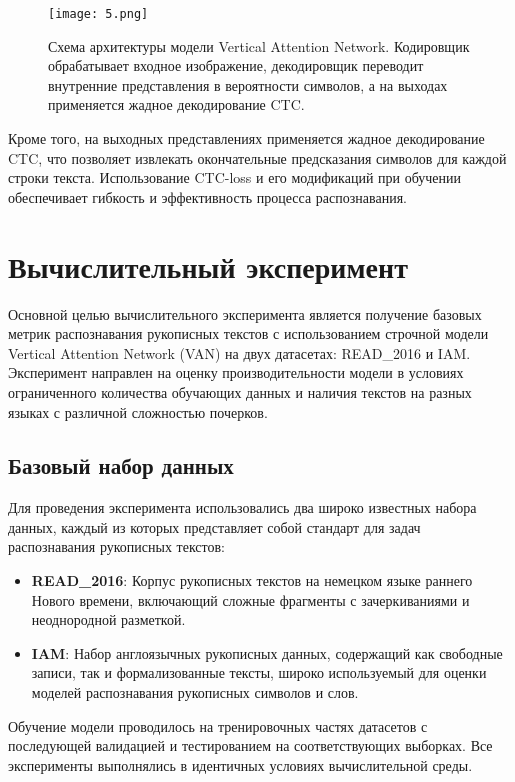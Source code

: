 \documentclass{article}
\begin{document}
\begin{figure}[h]
    \centering
    \texttt{[image: 5.png]}
    \caption{Схема архитектуры модели Vertical Attention Network. Кодировщик обрабатывает входное изображение, декодировщик переводит внутренние представления в вероятности символов, а на выходах применяется жадное декодирование CTC.}
    \label{fig:architecture}
\end{figure}

Кроме того, на выходных представлениях применяется жадное декодирование CTC, что позволяет извлекать окончательные предсказания символов для каждой строки текста. Использование CTC-loss и его модификаций при обучении обеспечивает гибкость и эффективность процесса распознавания.


\section{Вычислительный эксперимент}

Основной целью вычислительного эксперимента является получение базовых метрик распознавания рукописных текстов с использованием строчной модели Vertical Attention Network (VAN) на двух датасетах: READ\_2016 и IAM. Эксперимент направлен на оценку производительности модели в условиях ограниченного количества обучающих данных и наличия текстов на разных языках с различной сложностью почерков.

\subsection{Базовый набор данных}

Для проведения эксперимента использовались два широко известных набора данных, каждый из которых представляет собой стандарт для задач распознавания рукописных текстов:

\begin{itemize}
\item \textbf{READ\_2016}: Корпус рукописных текстов на немецком языке раннего Нового времени, включающий сложные фрагменты с зачеркиваниями и неоднородной разметкой.
\item \textbf{IAM}: Набор англоязычных рукописных данных, содержащий как свободные записи, так и формализованные тексты, широко используемый для оценки моделей распознавания рукописных символов и слов.
\end{itemize}

Обучение модели проводилось на тренировочных частях датасетов с последующей валидацией и тестированием на соответствующих выборках. Все эксперименты выполнялись в идентичных условиях вычислительной среды.
\end{document}
